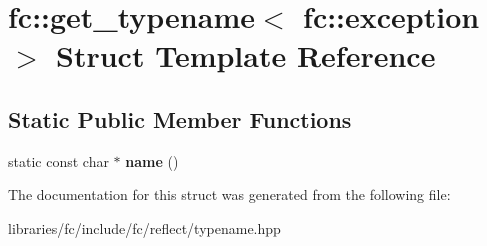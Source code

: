 \hypertarget{structfc_1_1get__typename_3_01fc_1_1exception_01_4}{}\section{fc\+:\+:get\+\_\+typename$<$ fc\+:\+:exception $>$ Struct Template Reference}
\label{structfc_1_1get__typename_3_01fc_1_1exception_01_4}
\subsection*{Static Public Member Functions}
\begin{DoxyCompactItemize}
\item 
\mbox{\label{structfc_1_1get__typename_3_01fc_1_1exception_01_4_a7f71dae94b7edda0da5338c6d57c5a24}} 
static const char $\ast$ {\bfseries name} ()
\end{DoxyCompactItemize}


The documentation for this struct was generated from the following file\+:\begin{DoxyCompactItemize}
\item 
libraries/fc/include/fc/reflect/typename.\+hpp\end{DoxyCompactItemize}
